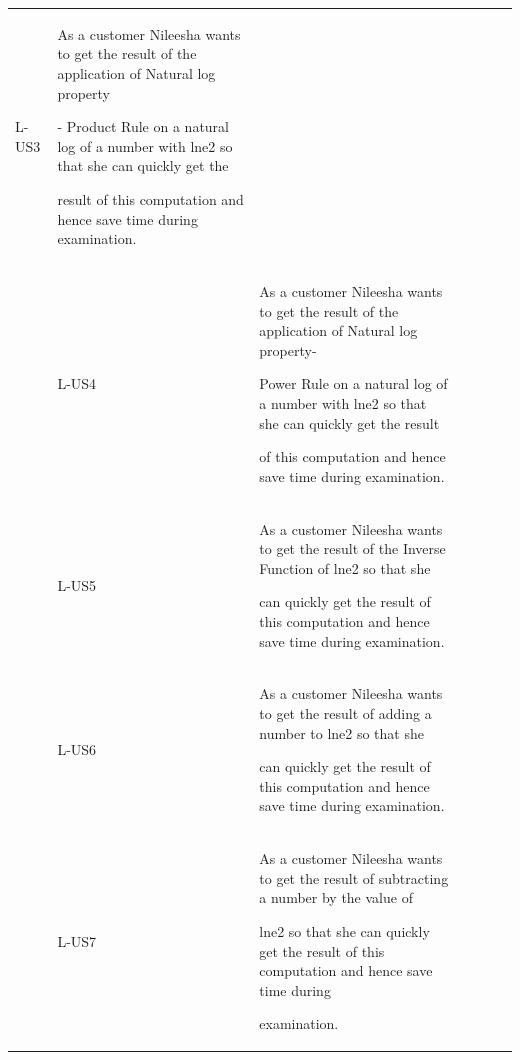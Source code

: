 \documentclass[12pt]{article}
\begin{document}
{\begin{longtable}{p{0.56in}p{0.65in}p{1.19in}p{0.53in}p{0.46in}p{0.64in}p{0.99in}}
\multicolumn{1}{|p{0.65in}}{L-US3} & 
\multicolumn{1}{|p{1.19in}}{As a customer Nileesha wants to get the result of the application of Natural log property \par - Product Rule on a natural log of a number with lne2 so that she can quickly get the \par result of this computation and hence save time during examination.} & 
\multicolumn{1}{|p{0.53in}}{} & 
\multicolumn{1}{|p{0.46in}}{} & 
\multicolumn{1}{|p{0.64in}}{} & 
\multicolumn{1}{|p{0.99in}|}{} \\
\hhline{-------}
\multicolumn{1}{|p{0.56in}}{Local} & 
\multicolumn{1}{|p{0.65in}}{L-US4} & 
\multicolumn{1}{|p{1.19in}}{As a customer Nileesha wants to get the result of the application of Natural log property- \par Power Rule on a natural log of a number with lne2 so that she can quickly get the result \par of this computation and hence save time during examination.} & 
\multicolumn{1}{|p{0.53in}}{} & 
\multicolumn{1}{|p{0.46in}}{} & 
\multicolumn{1}{|p{0.64in}}{} & 
\multicolumn{1}{|p{0.99in}|}{} \\
\hhline{-------}
\multicolumn{1}{|p{0.56in}}{Local} & 
\multicolumn{1}{|p{0.65in}}{L-US5} & 
\multicolumn{1}{|p{1.19in}}{As a customer Nileesha wants to get the result of the Inverse Function of lne2 so that she \par can quickly get the result of this computation and hence save time during examination.} & 
\multicolumn{1}{|p{0.53in}}{} & 
\multicolumn{1}{|p{0.46in}}{} & 
\multicolumn{1}{|p{0.64in}}{} & 
\multicolumn{1}{|p{0.99in}|}{} \\
\hhline{-------}
\multicolumn{1}{|p{0.56in}}{Local} & 
\multicolumn{1}{|p{0.65in}}{L-US6} & 
\multicolumn{1}{|p{1.19in}}{As a customer Nileesha wants to get the result of adding a number to lne2 so that she \par can quickly get the result of this computation and hence save time during examination.} & 
\multicolumn{1}{|p{0.53in}}{} & 
\multicolumn{1}{|p{0.46in}}{} & 
\multicolumn{1}{|p{0.64in}}{} & 
\multicolumn{1}{|p{0.99in}|}{} \\
\hhline{-------}
\multicolumn{1}{|p{0.56in}}{Local} & 
\multicolumn{1}{|p{0.65in}}{L-US7} & 
\multicolumn{1}{|p{1.19in}}{As a customer Nileesha wants to get the result of subtracting a number by the value of \par lne2 so that she can quickly get the result of this computation and hence save time during \par examination.} & 

\end{longtable}}
\end{document}
